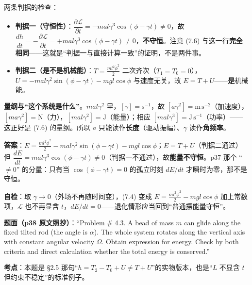 \documentclass[11pt]{ctexart}
\begin{document}
两条判据的检查：
\begin{itemize}
\item \textbf{判据一（守恒性）}：$\dfrac{\partial\mathcal{L}}{\partial t}=-mal\gamma^3\cos(\phi-\gamma t)\ne0$，故 $\dfrac{dh}{dt}=-\dfrac{\partial\mathcal{L}}{\partial t}=+mal\gamma^3\cos(\phi-\gamma t)\ne0$，\textbf{不守恒}。注意 (7.6) 与这一行\textbf{完全相同}——这就是“判据一与直接计算一致”的证明，不是两件事。
\item \textbf{判据二（是不是机械能）}：$T=\frac{ml^2\dot\phi^2}{2}$ 二次齐次（$T_1=T_0=0$），$U=-mal\gamma^2\sin(\phi-\gamma t)-mgl\cos\phi$ 与速度无关，故 $E=T+U$——\textbf{是}机械能。
\end{itemize}

\textbf{量纲与“这个系统是什么”}。$mal\gamma^2$ 里，$[\gamma]=\mathrm{s^{-1}}$，故 $[a\gamma^2]=\mathrm{m\,s^{-2}}$（加速度），$[ma\gamma^2]=\mathrm{N}$（力），$[mal\gamma^2]=\mathrm{J}$（能量）；相应 $[mal\gamma^3]=\mathrm{J\,s^{-1}}$（功率）——这正好是 (7.6) 的量纲。所以 $a$ 只能读作\textbf{长度}（驱动振幅）、$\gamma$ 读作\textbf{角频率}。


\textbf{答案}：$E=\frac{ml^2\dot\phi^2}{2}-mal\gamma^2\sin(\phi-\gamma t)-mgl\cos\phi$；$E=T+U$（判据二通过）但 $\dfrac{dE}{dt}=mal\gamma^3\cos(\phi-\gamma t)\ne0$（判据一不通过），故\textbf{能量不守恒}。p37 那个 “$\ne0$” 的分量：只有当 $\cos(\phi-\gamma t)=0$ 的孤立时刻 $dE/dt$ 才瞬时为零，那不是守恒。

\textbf{自检}：取 $\gamma\to0$（外场不再随时间变），(7.4) 变成 $E=\frac{ml^2\dot\phi^2}{2}-mgl\cos\phi$ 加上常数项，$\mathcal{L}$ 也不再显含 $t$，$dE/dt=0$——退化情形应当回到“普通摆能量守恒”。


\textbf{题面（p38 原文照抄）}：“Problem \# 4.3. A bead of mass $m$ can glide along the fixed tilted rod (the angle is $\alpha$). The whole system rotates along the vertical axis with constant angular velocity $\Omega$. Obtain expression for energy. Check by both criteria and direct calculation whether the total energy is conserved.”

\textbf{考点}：本题是 §2.5 那句“$h=T_2-T_0+U\ne T+U$”的实物版本，也是“$L$ 不显含 $t$ 但约束不稳定”的标准例子。
\end{document}
